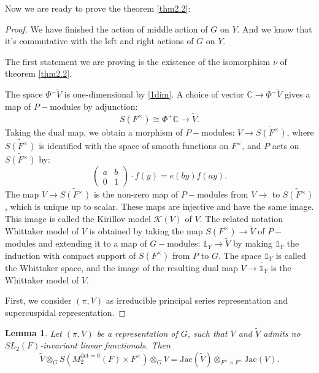 \documentclass[12pt,a4paper,english]{article}
\theoremstyle{plain}
\newtheorem{lem}[thm]{Lemma}
\theoremstyle{definition}
\begin{document}
Now we are ready to prove the theorem \ref{thm2.2}:
\begin{proof} 
We have finished the action of middle action of $G$ on $Y$. And we know that it's commutative with the left and right actions of $G $ on $Y$.

The first statement we are proving is the existence of the isomorphism $\nu$ of theorem \ref{thm2.2}.

The space $\Phi^{-}\tilde{V}$ is one-dimensional by \ref{1dim}. A choice of vector $\mathbb{C}\rightarrow \Phi^{-}\tilde{V}$ gives a map of $P-$modules by adjunction:
\begin{equation*}
    S(F^{\times})\cong \Phi^{+}\mathbb{C}\rightarrow \tilde{V}.
\end{equation*}
Taking  the dual map, we obtain a morphism of $P-$modules: $V\rightarrow\widetilde{S(F^{\times})}$, where $\widetilde{S(F^{\times})}$ is identified with the space of smooth functions on $F^{\times}$, and $P$ acts on $\widetilde{S(F^{\times})}$ by:
\begin{equation*}
    \begin{pmatrix}
    a&b\\
    0&1
    \end{pmatrix}\cdot f(y)=e(by)f(ay).
\end{equation*}
The map $V\rightarrow \widetilde{S(F^{\times})}$ is the non-zero map of $P-$modules from $V\rightarrow $ to $\widetilde{S(F^{\times})}$, which is unique up to scalar. These maps are injective and have the same image. This image is called the Kirillov model $\mathcal{K}(V)$ of $V$. The related notation Whittaker model of $V$ is obtained by taking the map $S(F^{\times})\rightarrow \tilde{V}$ of $P-$modules and extending it to a map of $G-$modules: $\mathbb{1}_{Y}\rightarrow\tilde{V}$ by making $\mathbb{1}_{Y}$ the induction with compact support of $S(F^{\times})$ from $P$ to $G$. The space $\mathbb{1}_{Y}$ is called the Whittaker space, and the image of the resulting dual map $V\rightarrow\tilde{\mathbb{1}_{Y}}$ is the Whittaker model of $V$.




First, we consider $(\pi, V)$ as irreducible principal series representation and supercuspidal representation. 


\end{proof}

\begin{lem}
Let $(\pi, V)$ be a representation of $G$, such that $V$ and $\tilde{V}$ admits no $SL_{2}(F)$-invariant linear functionals. Then 
\begin{equation*}
    \tilde{V}\otimes_{G}S(M^{\text{det}=0}_{2}(F)\times F^{\times})\otimes_{G} V =\text{Jac}(\tilde{V})\otimes_{F^{\times}\times F^{\times}} \text{Jac}(V).
\end{equation*}
\end{lem}
\end{document}
